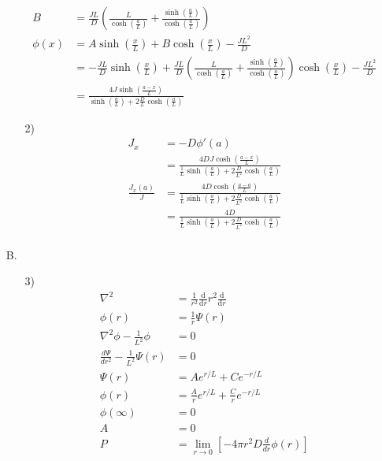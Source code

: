 \documentclass{article}
\begin{document}
\begin{itemize}
\begin{itemize}
\begin{align*}
            B&=\frac{JL}{D}\left(\frac{L}{\cosh\left(\frac{a}{L}\right)}+\frac{\sinh\left(\frac{a }{L}\right)}{\cosh\left(\frac{a}{L}\right)}\right)\\
            \phi(x)&=A\sinh(\frac{x}{L})+B\cosh(\frac{x}{L})-\frac{JL^2}{D}\\
            &=-\frac{JL}{D}\sinh(\frac{x}{L})+\frac{JL}{D}\left(\frac{L}{\cosh\left(\frac{a}{L}\right)}+\frac{\sinh\left(\frac{a }{L}\right)}{\cosh\left(\frac{a}{L}\right)}\right)\cosh\left(\frac{x}{L}\right)-\frac{JL^2}{D}\\
            &=\frac{4J\sinh\left(\frac{a-x}{L}\right)}{\sinh\left(\frac{a}{L}\right)+2\frac{D}{L}\cosh\left(\frac{a}{L}\right)}
        \end{align*}
        \item [2)]
        \begin{align*}
            J_x&=-D\phi'(a)\\
            &=\frac{4DJ\cosh\left(\frac{a-x}{L}\right)}{\frac{1}{L}\sinh\left(\frac{a}{L}\right)+2\frac{D}{L^2}\cosh\left(\frac{a}{L}\right)}\\
            \frac{J_x(a)}{J}&=\frac{4D\cosh\left(\frac{a-a}{L}\right)}{\frac{1}{L}\sinh\left(\frac{a}{L}\right)+2\frac{D}{L^2}\cosh\left(\frac{a}{L}\right)}\\
            &=\frac{4D}{\frac{1}{L}\sinh\left(\frac{a}{L}\right)+2\frac{D}{L^2}\cosh\left(\frac{a}{L}\right)}\\
        \end{align*}
    \end{itemize}
    \item [B.]
    \begin{itemize}
        \item [3)]
        \begin{align*}
            \nabla^2&=\frac{1}{r^2}\frac{\text{d}}{\text{d}r}r^2\frac{\text{d}}{\text{d}r}\\
            \phi(r)&=\frac{1}{r}\Psi(r)\\
            \nabla^2 \phi-\frac{1}{L^2}\phi&=0\\
            \frac{d\Psi}{dr^2}-\frac{1}{L^2}\Psi(r)&=0\\
            \Psi(r)&=Ae^{r/L}+Ce^{-r/L}\\
            \phi(r)&=\frac{A}{r}e^{r/L}+\frac{C}{r}e^{-r/L}\\
            \phi(\infty)&=0\\
            A&=0\\
            P&=\lim_{r\rightarrow 0}\left[-4\pi r^2D\frac{d}{dr}\phi(r)\right]\\

\end{align*}
\end{itemize}
\end{itemize}
\end{document}
